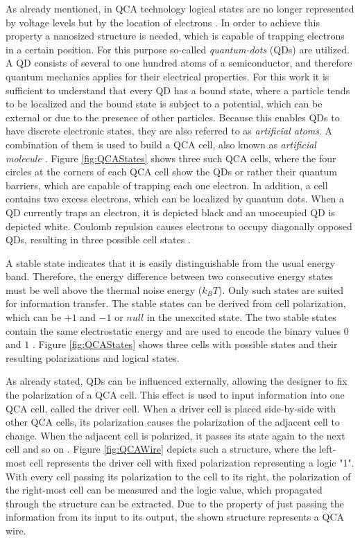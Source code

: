 As already mentioned, in QCA technology logical states are no longer represented by voltage levels but by the location of electrons \cite{QCA_technology}. In order to achieve this property a nanosized structure is needed, which is capable of trapping electrons in a certain position. For this purpose so-called \textit{quantum-dots} (QDs) are utilized. A QD consists of several to one hundred
atoms of a semiconductor, and therefore quantum mechanics applies for their electrical properties. For this work it is sufficient to understand that every QD has a bound state, where a particle tends to be localized and the bound state is subject to a potential, which can be external or due to the presence of other particles. Because this enables QDs to have discrete electronic states, they are also referred to as \textit{artificial atoms}. A combination of them is used to build a QCA cell, also known as \textit{artificial molecule} \cite{Quantum_dots}. Figure \ref{fig:QCAStates} shows three such QCA cells, where the four circles at the corners of each QCA cell show the QDs or rather their quantum barriers, which are capable of trapping each one electron. In addition, a cell contains two excess electrons, which can be localized by quantum dots. When a QD currently traps an electron, it is depicted black and an unoccupied QD is depicted white. Coulomb repulsion causes electrons to occupy diagonally opposed QDs, resulting in three possible cell states \cite{Sasamal2020QuantumDotCA, lent1997device, lent1994quantum}.

A stable state indicates that it is easily distinguishable from the usual energy band. Therefore, the energy difference between two consecutive energy states must be well above the thermal noise energy ($k_BT$). Only such states are suited for information transfer. The stable states can be derived from cell polarization, which can be $+1$ and $-1$ or $null$ in the unexcited state. The two stable states contain the same electrostatic energy and are used to encode the binary values $0$ and $1$ \cite{Sasamal2020QuantumDotCA}. Figure \ref{fig:QCAStates} shows three cells with possible states and their resulting polarizations and logical states.

As already stated, QDs can be influenced externally, allowing the designer to fix the polarization of a QCA cell. This effect is used to input information into one QCA cell, called the driver cell. When a driver cell is placed side-by-side with other QCA cells, its polarization causes the polarization of the adjacent cell to change. When the adjacent cell is polarized, it passes its state again to the next cell and so on \cite{lent1997device}. Figure \ref{fig:QCAWire} depicts such a structure, where the left-most cell represents the driver cell with fixed polarization representing a logic "1". With every cell passing its polarization to the cell to its right, the polarization of the right-most cell can be measured and the logic value, which propagated through the structure can be extracted. Due to the property of just passing the information from its input to its output, the shown structure represents a QCA wire.

